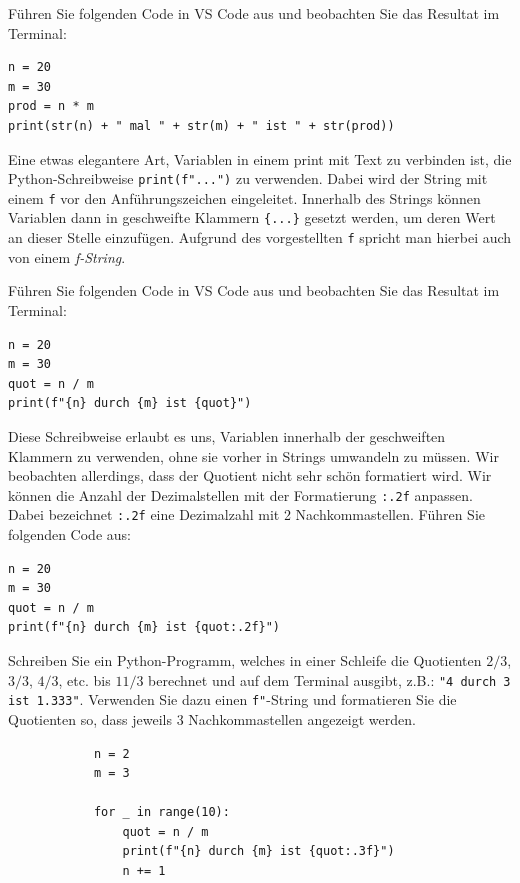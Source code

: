 \begin{myexample} Führen Sie folgenden Code in VS Code aus und beobachten Sie das Resultat im Terminal:
\begin{lstlisting}[numbers=none]
n = 20
m = 30
prod = n * m
print(str(n) + " mal " + str(m) + " ist " + str(prod))
\end{lstlisting}
\end{myexample}

Eine etwas elegantere Art, Variablen in einem print mit Text zu verbinden ist, die Python-Schreibweise \lstinline|print(f"...")| zu verwenden. Dabei wird der String mit einem \lstinline|f| vor den Anführungszeichen eingeleitet. Innerhalb des Strings können Variablen dann in geschweifte Klammern \lstinline|{...}| gesetzt werden, um deren Wert an dieser Stelle einzufügen. Aufgrund des vorgestellten \lstinline|f| spricht man hierbei auch von einem \emph{f-String}.

\begin{myexample}
Führen Sie folgenden Code in VS Code aus und beobachten Sie das Resultat im Terminal:
\begin{lstlisting}[numbers=none]
n = 20
m = 30
quot = n / m
print(f"{n} durch {m} ist {quot}")
\end{lstlisting}
Diese Schreibweise erlaubt es uns, Variablen innerhalb der geschweiften Klammern zu verwenden, ohne sie vorher in Strings umwandeln zu müssen. Wir beobachten allerdings, dass der Quotient nicht sehr schön formatiert wird. Wir können die Anzahl der Dezimalstellen mit der Formatierung \lstinline|:.2f| anpassen. Dabei bezeichnet \lstinline|:.2f| eine Dezimalzahl mit 2 Nachkommastellen. Führen Sie folgenden Code aus:
\begin{lstlisting}[numbers=none]
n = 20
m = 30
quot = n / m
print(f"{n} durch {m} ist {quot:.2f}")
\end{lstlisting}
\end{myexample}

\begin{myexercise}
	Schreiben Sie ein Python-Programm, welches in einer Schleife die Quotienten $2/3$, $3/3$, $4/3$, etc. bis $11/3$ berechnet und auf dem Terminal ausgibt, z.B.: \lstinline|"4 durch 3 ist 1.333"|. Verwenden Sie dazu einen \lstinline|f"|-String und formatieren Sie die Quotienten so, dass jeweils 3 Nachkommastellen angezeigt werden.
	\begin{myanswer}
		\begin{lstlisting}
			n = 2
			m = 3
			
			for _ in range(10):
				quot = n / m
				print(f"{n} durch {m} ist {quot:.3f}")
				n += 1
		\end{lstlisting}
	\end{myanswer}
\end{myexercise}

